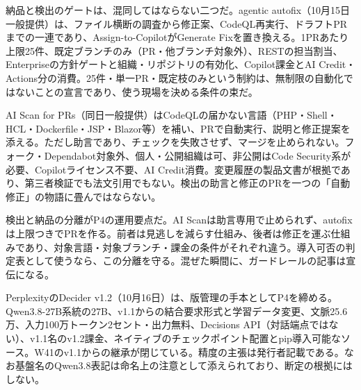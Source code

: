 \documentclass[lualatex,a4paper,10pt]{jlreq}
\begin{document}
納品と検出のゲートは、混同してはならない二つだ。agentic autofix（10月15日一般提供）は、ファイル横断の調査から修正案、CodeQL再実行、ドラフトPRまでの一連であり、Assign-to-CopilotがGenerate Fixを置き換える。1PRあたり上限25件、既定ブランチのみ（PR・他ブランチ対象外）、RESTの担当割当、Enterpriseの方針ゲートと組織・リポジトリの有効化、Copilot課金とAI Credit・Actions分の消費。25件・単一PR・既定枝のみという制約は、無制限の自動化ではないことの宣言であり、使う現場を決める条件の束だ。

AI Scan for PRs（同日一般提供）はCodeQLの届かない言語（PHP・Shell・HCL・Dockerfile・JSP・Blazor等）を補い、PRで自動実行、説明と修正提案を添える。ただし助言であり、チェックを失敗させず、マージを止められない。フォーク・Dependabot対象外、個人・公開組織は可、非公開はCode Security系が必要、Copilotライセンス不要、AI Credit消費。変更履歴の製品文書が根拠であり、第三者検証でも法文引用でもない。検出の助言と修正のPRを一つの「自動修正」の物語に畳んではならない。

検出と納品の分離がP4の運用要点だ。AI Scanは助言専用で止められず、autofixは上限つきでPRを作る。前者は見逃しを減らす仕組み、後者は修正を運ぶ仕組みであり、対象言語・対象ブランチ・課金の条件がそれぞれ違う。導入可否の判定表として使うなら、この分離を守る。混ぜた瞬間に、ガードレールの記事は宣伝になる。

PerplexityのDecider v1.2（10月16日）は、版管理の手本としてP4を締める。Qwen3.8-27B系統の27B、v1.1からの結合要求形式と学習データ変更、文脈25.6万、入力100万トークン2セント・出力無料、Decisions API（対話端点ではない）、v1.1名のv1.2課金、ネイティブのチェックポイント配置とpip導入可能なソース。W41のv1.1からの継承が閉じている。精度の主張は発行者記載である。なお基盤名のQwen3.8表記は命名上の注意として添えられており、断定の根拠にはしない。
\end{document}
